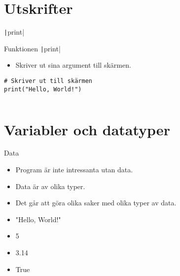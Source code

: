 \begin{frame}[fragile]
  \inputminted[highlightlines={1-10},linenos]{python}{examples/age.py}
\end{frame}


\section{Utskrifter}

\begin{frame}[fragile]
  \begin{center}
    \texttt|print|
  \end{center}
\end{frame}

\begin{frame}[fragile]
  \begin{block}{Funktionen \texttt|print|}
    \begin{itemize}
      \item Skriver ut sina argument till skärmen.
    \end{itemize}
  \end{block}

  \pause

  \begin{example}
    \begin{verbatim}
# Skriver ut till skärmen
print("Hello, World!")
    \end{verbatim}
  \end{example}
\end{frame}

\begin{frame}[fragile]
  \inputminted[highlightlines={14,20,22,27-28},linenos,firstline=11]{python}{examples/age.py}
\end{frame}


\section{Variabler och datatyper}

\begin{frame}
  \begin{block}{Data}
    \begin{itemize}
      \item Program är inte intressanta utan data.
      \item Data är av olika typer.
      \item Det går att göra olika saker med olika typer av data.
    \end{itemize}
  \end{block}

  \pause

  \begin{example}[Litteraler]
    \begin{itemize}
      \item "Hello, World!"
      \item 5
      \item 3.14
      \item True
    \end{itemize}
  \end{example}
\end{frame}

